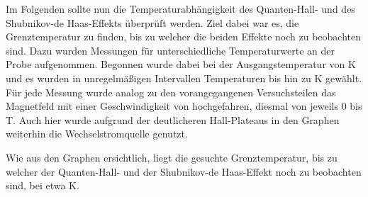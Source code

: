 
Im Folgenden sollte nun die Temperaturabhängigkeit des Quanten-Hall- und des Shubnikov-de Haas-Effekts überprüft werden. Ziel dabei war es, die Grenztemperatur zu finden, bis zu welcher die beiden Effekte noch zu beobachten sind. 
Dazu wurden Messungen für unterschiedliche Temperaturwerte an der Probe aufgenommen. Begonnen wurde dabei bei der Ausgangstemperatur von \unit[2]{K} und es wurden in unregelmäßigen Intervallen Temperaturen bis hin zu \unit[40]{K} gewählt. Für jede Messung wurde analog zu den vorangegangenen Versuchsteilen das Magnetfeld mit einer Geschwindigkeit von  hochgefahren, diesmal von jeweils 0 bis \unit[7,7]{T}. Auch hier wurde aufgrund der deutlicheren Hall-Plateaus in den Graphen weiterhin die Wechselstromquelle genutzt. 

Wie aus den Graphen %
ersichtlich, liegt die gesuchte Grenztemperatur, bis zu welcher der Quanten-Hall- und der Shubnikov-de Haas-Effekt noch zu beobachten sind, bei etwa \unit[15]{K}. %





